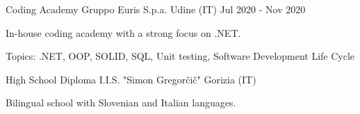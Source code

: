 

\begin{cventries}

\cventry
    {Coding Academy} %
    {Gruppo Euris S.p.a.} %
    {Udine (IT)} %
    {Jul 2020 - Nov 2020} %
    {
      \begin{cvitems} %
        \item {In-house coding academy with a strong focus on .NET.}
        \item {Topics: .NET, OOP, SOLID, SQL, Unit testing, Software Development Life Cycle}
      \end{cvitems}
    }

\cventry
    {High School Diploma} %
    {I.I.S. "Simon Gregorčič"} %
    {Gorizia (IT)} %
    {} %
    {
      \begin{cvitems} %
        \item {Bilingual school with Slovenian and Italian languages.}
      \end{cvitems}
    }
\end{cventries}
